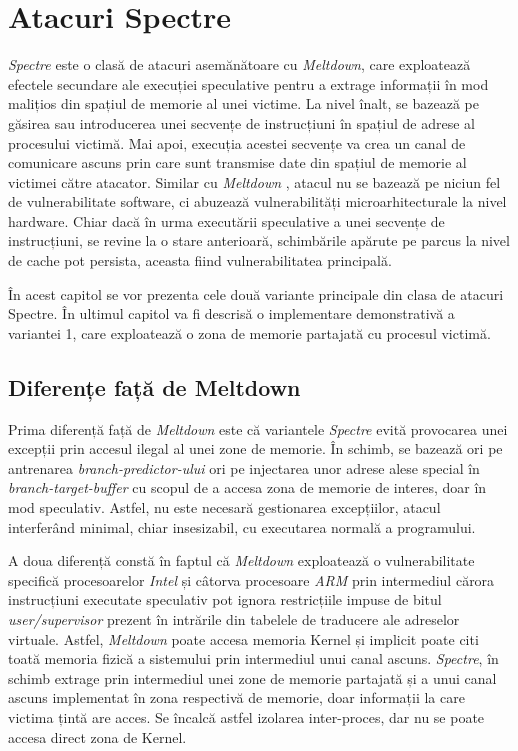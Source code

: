 \chapter{Atacuri Spectre}

\emph{Spectre} \cite{spectre2019} este o clasă de atacuri asemănătoare cu
\emph{Meltdown}, care exploatează efectele secundare ale execuției speculative
pentru a extrage informații în mod malițios din spațiul de memorie al unei
victime. La nivel înalt, se bazează pe găsirea sau introducerea unei secvențe
de instrucțiuni în spațiul de adrese al procesului victimă. Mai apoi, execuția
acestei secvențe va crea un canal de comunicare ascuns prin care sunt transmise
date din spațiul de memorie al victimei către atacator. Similar cu
\emph{Meltdown} \cite{meltdown2018}, atacul nu se bazează pe niciun fel de
vulnerabilitate software, ci abuzează vulnerabilități microarhitecturale la
nivel hardware. Chiar dacă în urma executării speculative a unei secvențe de
instrucțiuni, se revine la o stare anterioară, schimbările apărute pe parcus la
nivel de cache pot persista, aceasta fiind vulnerabilitatea principală.

În acest capitol se vor prezenta cele două variante principale din clasa de
atacuri Spectre. În ultimul capitol va fi descrisă o implementare demonstrativă
a variantei 1, care exploatează o zona de memorie partajată cu procesul
victimă.

\section{Diferențe față de Meltdown}

Prima diferență față de \emph{Meltdown} este că variantele \emph{Spectre} evită
provocarea unei excepții prin accesul ilegal al unei zone de memorie. În
schimb, se bazează ori pe antrenarea \emph{branch-predictor-ului} ori pe
injectarea unor adrese alese special în \emph{branch-target-buffer} cu scopul
de a accesa zona de memorie de interes, doar în mod speculativ. Astfel, nu este
necesară gestionarea excepțiilor, atacul interferând minimal, chiar insesizabil,
cu executarea normală a programului.

A doua diferență constă în faptul că \emph{Meltdown} exploatează o
vulnerabilitate specifică procesoarelor \emph{Intel} și câtorva procesoare
\emph{ARM} prin intermediul cărora instrucțiuni executate speculativ pot ignora
restricțiile impuse de bitul \emph{user/supervisor} prezent în intrările din
tabelele de traducere ale adreselor virtuale. Astfel, \emph{Meltdown} poate
accesa memoria Kernel și implicit poate citi toată memoria fizică a sistemului
prin intermediul unui canal ascuns. \emph{Spectre}, în schimb extrage prin
intermediul unei zone de memorie partajată și a unui canal ascuns implementat
în zona respectivă de memorie, doar informații la care victima țintă are acces.
Se încalcă astfel izolarea inter-proces, dar nu se poate accesa direct zona de
Kernel.

